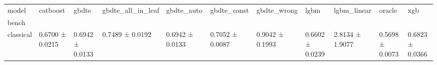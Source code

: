 \begin{tabular}{lllllllllll}
\toprule
model & catboost & gbdte & gbdte_all_in_leaf & gbdte_auto & gbdte_const & gbdte_wrong & lgbm & lgbm_linear & oracle & xgb \\
bench &  &  &  &  &  &  &  &  &  &  \\
\midrule
classical & 0.6700 ± 0.0215 & 0.6942 ± 0.0133 & 0.7489 ± 0.0192 & 0.6942 ± 0.0133 & 0.7052 ± 0.0087 & 0.9042 ± 0.1993 & 0.6602 ± 0.0239 & 2.8134 ± 1.9077 & 0.5698 ± 0.0073 & 0.6823 ± 0.0366 \\
\bottomrule
\end{tabular}

